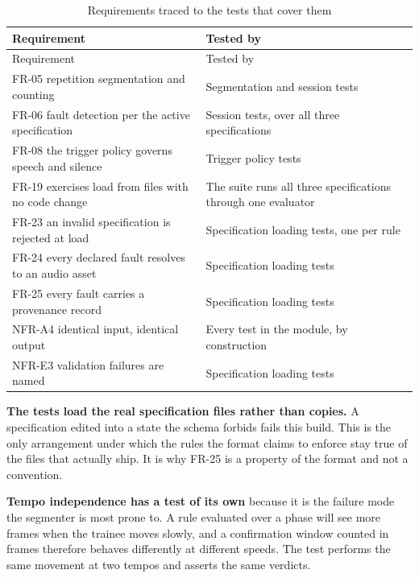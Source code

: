 {\small
\setlength{\LTpre}{6pt}\setlength{\LTpost}{8pt}
\begin{longtable}{>{\raggedright\arraybackslash}p{}>{\raggedright\arraybackslash}p{}}
\caption{Requirements traced to the tests that cover them}\\
\toprule
Requirement & Tested by \\
\midrule
\endfirsthead
\toprule
Requirement & Tested by \\
\midrule
\endhead
\bottomrule
\endfoot
\bottomrule
\endlastfoot
FR-05 repetition segmentation and counting & Segmentation and session tests \\
FR-06 fault detection per the active specification & Session tests, over all three specifications \\
FR-08 the trigger policy governs speech and silence & Trigger policy tests \\
FR-19 exercises load from files with no code change & The suite runs all three specifications through one evaluator \\
FR-23 an invalid specification is rejected at load & Specification loading tests, one per rule \\
FR-24 every declared fault resolves to an audio asset & Specification loading tests \\
FR-25 every fault carries a provenance record & Specification loading tests \\
NFR-A4 identical input, identical output & Every test in the module, by construction \\
NFR-E3 validation failures are named & Specification loading tests \\
\end{longtable}
}

\textbf{The tests load the real specification files rather than copies.} A specification edited into a state the schema forbids fails this build. This is the only arrangement under which the rules the format claims to enforce stay true of the files that actually ship. It is why FR-25 is a property of the format and not a convention.

\textbf{Tempo independence has a test of its own} because it is the failure mode the segmenter is most prone to. A rule evaluated over a phase will see more frames when the trainee moves slowly, and a confirmation window counted in frames therefore behaves differently at different speeds. The test performs the same movement at two tempos and asserts the same verdicts.

